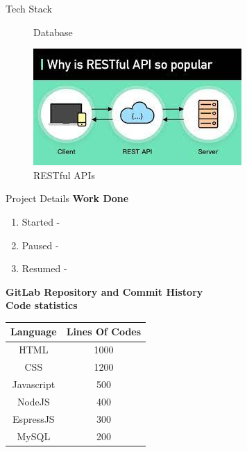 \documentclass{beamer}
\begin{document}
\begin{frame}{Tech Stack}
\begin{figure}
\begin{minipage}[t]{0.2\textwidth}
            \caption{Database}
        \end{minipage}\hfill
        \begin{minipage}[t]{0.2\textwidth}
            \centering
            \includegraphics[width=\textwidth]{API.jpeg}
            \caption{RESTful APIs}
        \end{minipage}\hfill
    \end{figure}
\end{frame}

\begin{frame}{Project Details}
    \textbf{Work Done}
    \begin{enumerate}
        \item Started - 
        \item Paused  - 
        \item Resumed - 
    \end{enumerate}
    \textbf{GitLab Repository and Commit History}
    \bigskip
    \\
    \textbf{Code statistics}
    \begin{table}
        \centering
        \begin{tabular}{cc}
        \hline
        Language & Lines Of Codes \\
        \hline
        HTML & 1000 \\
        CSS & 1200 \\
        Javascript & 500 \\
        NodeJS & 400 \\
        EspressJS & 300 \\
        MySQL & 200 \\
        \hline
        \end{tabular}
    \end{table}
\end{frame}      
\end{document}
